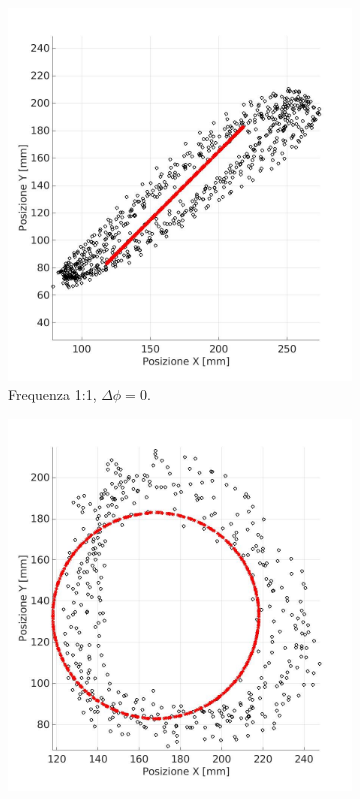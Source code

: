 \documentclass[12pt,twoside,openright]{report}
\begin{document}
\begin{figure}[h!]
\centering
\begin{subfigure}{0.49\textwidth}
    \includegraphics[width=\textwidth]{rn.jpg}
    \caption{Frequenza 1:1, $\Delta \phi= 0$.}
    \label{fig:r1}
    \vspace*{10mm}
\end{subfigure}
\hfill
\begin{subfigure}{0.49\textwidth}
    \includegraphics[width=\textwidth]{cn.jpg}

\end{subfigure}
\end{figure}
\end{document}
